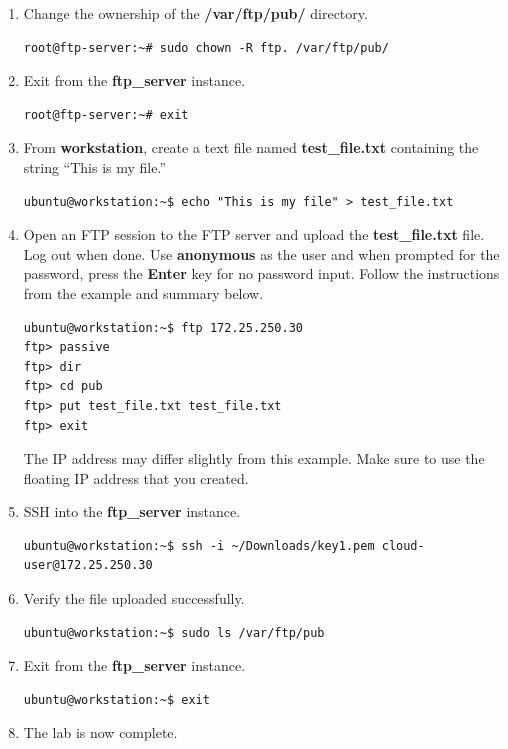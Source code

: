 \documentclass[letterpaper, 12pt]{article}
\begin{document}
\begin{enumerate}
    \item Change the ownership of the \textbf{/var/ftp/pub/} directory.
\begin{lstlisting}
root@ftp-server:~# sudo chown -R ftp. /var/ftp/pub/
\end{lstlisting}

    \item Exit from the \textbf{ftp\_server} instance.
\begin{lstlisting}
root@ftp-server:~# exit
\end{lstlisting}

    \item From \textbf{workstation}, create a text file named \textbf{test\_file.txt} containing the string ``This is my
    file.''
\begin{lstlisting}
ubuntu@workstation:~$ echo "This is my file" > test_file.txt
\end{lstlisting}

    \item Open an FTP session to the FTP server and upload the \textbf{test\_file.txt} file. Log out when done. Use
    \textbf{anonymous} as the user and when prompted for the password, press the \textbf{Enter} key for no password
    input. Follow the instructions from the example and summary below.
\begin{lstlisting}
ubuntu@workstation:~$ ftp 172.25.250.30
ftp> passive
ftp> dir
ftp> cd pub
ftp> put test_file.txt test_file.txt
ftp> exit
\end{lstlisting}

    \begin{notebox}{}
        The IP address may differ slightly from this example. Make sure to use the floating IP address that you created.
    \end{notebox}

    \item SSH into the \textbf{ftp\_server} instance.
\begin{lstlisting}
ubuntu@workstation:~$ ssh -i ~/Downloads/key1.pem cloud-user@172.25.250.30
\end{lstlisting}

    \item Verify the file uploaded successfully.
\begin{lstlisting}
ubuntu@workstation:~$ sudo ls /var/ftp/pub
\end{lstlisting}

    \item Exit from the \textbf{ftp\_server} instance.
\begin{lstlisting}
ubuntu@workstation:~$ exit
\end{lstlisting}

    \item The lab is now complete.

\end{enumerate}
\end{document}
